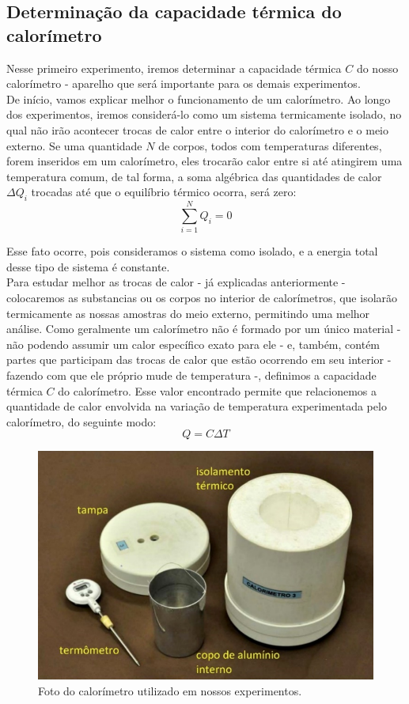 \subsection{Determinação da capacidade térmica do calorímetro}

Nesse primeiro experimento, iremos determinar a capacidade térmica $C$ do nosso calorímetro - aparelho que será importante para os demais experimentos.\\

De início, vamos explicar melhor o funcionamento de um calorímetro. Ao longo dos experimentos, iremos considerá-lo como um sistema termicamente isolado, no qual não irão acontecer trocas de calor entre o interior do calorímetro e o meio externo. Se uma quantidade $N$ de corpos, todos com temperaturas diferentes, forem inseridos em um calorímetro, eles trocarão calor entre si até atingirem uma temperatura comum, de tal forma, a soma algébrica das quantidades de calor $\Delta Q_i$ trocadas até que o equilíbrio térmico ocorra, será zero:
\[ \sum_{i=1}^{N} Q_i = 0\]

Esse fato ocorre, pois consideramos o sistema como isolado, e a energia total desse tipo de sistema é constante.\\

Para estudar melhor as trocas de calor - já explicadas anteriormente - colocaremos as substancias ou os corpos no interior de calorímetros, que isolarão termicamente as nossas amostras do meio externo, permitindo uma melhor análise. Como geralmente um calorímetro não é formado por um único material - não podendo assumir um calor específico exato para ele - e, também, contém partes que participam das trocas de calor que estão ocorrendo em seu interior - fazendo com que ele próprio mude de temperatura -, definimos a capacidade térmica $C$ do calorímetro. Esse valor encontrado permite que relacionemos a quantidade de calor envolvida na variação de temperatura experimentada pelo calorímetro, do seguinte modo:
\[ Q = C \Delta T\]

\begin{figure}[H]
  \centering
  \includegraphics[scale=0.67]{images/calorimetro.png}
  \caption{Foto do calorímetro utilizado em nossos experimentos.}
\end{figure}


